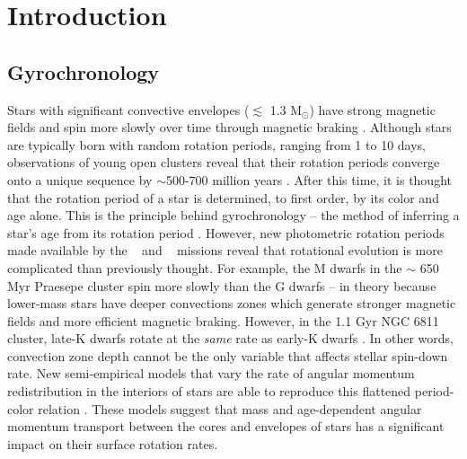 \section{Introduction}

\subsection{Gyrochronology}

Stars with significant convective envelopes ($\lesssim$ 1.3 M$_\odot$) have
strong magnetic fields and spin more slowly over time through magnetic braking
\citep[\eg][]{schatzman1962, weber1967, skumanich1972, kawaler1988,
pinsonneault1989}.
Although stars are typically born with random rotation periods, ranging from 1
to 10 days, observations of young open clusters reveal that their rotation
periods converge onto a unique sequence by $\sim$500-700 million years
\citep[\eg][]{irwin2009}.
After this time, it is thought that the rotation period of a star is
determined, to first order, by its color and age alone.
This is the principle behind gyrochronology -- the method of inferring a
star’s age from its rotation period \citep[\eg][]{barnes2003, barnes2007,
barnes2010, meibom2011, meibom2015}.
However, new photometric rotation periods made available by the \kepler\
\citep{borucki2010} and \ktwo\ \citep{howell2014} missions
\citep[\eg][]{mcquillan2014, garcia2014, douglas2017, rebull2017, meibom2011,
meibom2015, curtis2019} reveal that rotational evolution is more complicated
than previously thought.
For example, the M dwarfs in the $\sim$ 650 Myr Praesepe cluster spin more
slowly than the G dwarfs -- in theory because lower-mass stars have deeper
convections zones which generate stronger magnetic fields and more efficient
magnetic braking.
However, in the 1.1 Gyr NGC 6811 cluster, late-K dwarfs rotate at the {\it
same} rate as early-K dwarfs \citep{curtis2019}.
In other words, convection zone depth cannot be the only variable that affects
stellar spin-down rate.
New semi-empirical models that vary the rate of angular momentum
redistribution in the interiors of stars are able to reproduce this flattened
period-color relation \citep{spada2019}.
These models suggest that mass and age-dependent angular momentum transport
between the cores and envelopes of stars has a significant impact on their
surface rotation rates.


